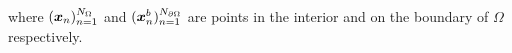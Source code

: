 where $({\bm{x}}_n)_{n=1}^{N_\Omega}$ and  $({\bm{x}}^b_n)_{n=1}^{N_{\partial\Omega}}$ are points in the interior and on the boundary of $\Omega$ respectively.


